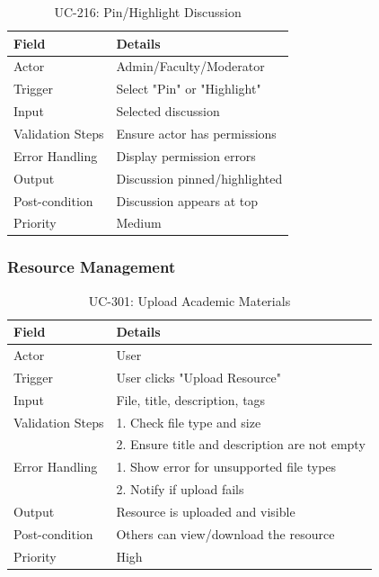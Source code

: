 \begin{table}[H]
\centering
\caption{UC-216: Pin/Highlight Discussion}
\begin{tabular}{|l|p{10cm}|}
\hline
\textbf{Field} & \textbf{Details} \\ \hline
Actor & Admin/Faculty/Moderator \\ \hline
Trigger & Select "Pin" or "Highlight" \\ \hline
Input & Selected discussion \\ \hline
Validation Steps & Ensure actor has permissions \\ \hline
Error Handling & Display permission errors \\ \hline
Output & Discussion pinned/highlighted \\ \hline
Post-condition & Discussion appears at top \\ \hline
Priority & Medium \\ \hline
\end{tabular}
\end{table}

\subsubsection{Resource Management}
\begin{table}[H]
\centering
\caption{UC-301: Upload Academic Materials}
\begin{tabular}{|l|p{10cm}|}
\hline
\textbf{Field} & \textbf{Details} \\ \hline
Actor & User \\ \hline
Trigger & User clicks "Upload Resource" \\ \hline
Input & File, title, description, tags \\ \hline
Validation Steps & 1. Check file type and size \\ 
                 & 2. Ensure title and description are not empty \\ \hline
Error Handling & 1. Show error for unsupported file types \\ 
               & 2. Notify if upload fails \\ \hline
Output & Resource is uploaded and visible \\ \hline
Post-condition & Others can view/download the resource \\ \hline
Priority & High \\ \hline
\end{tabular}
\end{table}

